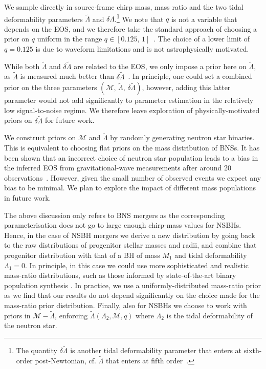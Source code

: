 \documentclass[twocolumn]{aastex631}
\begin{document}
We sample directly in source-frame chirp mass, mass ratio and the two
tidal deformability parameters $\tilde{\Lambda}$ and
$\delta\Lambda$.\footnote{The quantity $\delta\tilde{\Lambda}$ is another
tidal deformability parameter that enters at sixth-order post-Newtonian,
cf. $\tilde{\Lambda}$ that enters at fifth order~\citep[see][for
  definitions of the these quantities]{favata14,wade14}.}  We note that
$q$ is not a variable that depends on the EOS, and we therefore take the
standard approach of choosing a prior on $q$ uniform in the range
$q\in[0.125,\,1]$~\citep[e.g.,][]{romeroshaw20}. The choice of a lower
limit of $q=0.125$ is due to waveform limitations and is not
astrophysically motivated.

While both $\tilde{\Lambda}$ and $\delta\tilde{\Lambda}$ are
related to the EOS, we only impose a prior here on $\tilde{\Lambda}$, as
$\tilde{\Lambda}$ is measured much better than
$\delta\tilde{\Lambda}$~\citep[e.g.,][]{wade14}. In principle, one could
set a combined prior on the three parameters $(\mathcal{M},\,
\tilde{\Lambda}, \,\delta\tilde{\Lambda})$, however, adding this latter
parameter would not add significantly to parameter estimation in the
relatively low signal-to-noise regime. We therefore leave exploration of
physically-motivated priors on $\delta\tilde{\Lambda}$ for future work.

We construct priors on $\mathcal{M}$ and $\tilde{\Lambda}$ by randomly
generating neutron star binaries. This is equivalent to choosing flat
priors on the mass distribution of BNSs. It has been shown that an incorrect choice of neutron star population leads to a bias in the inferred EOS from
gravitational-wave measurements after around 20 observations~\citep[e.g.,][]{2015Agathos,2020Wysocki,2020Landry}. However, given the small number of observed
events we expect any bias to be minimal. We plan to explore
the impact of different mass populations in future work.

The above discussion only refers to BNS mergers as the corresponding
parameterisation does not go to large enough chirp-mass values for
NSBHs. Hence, in the case of NSBH mergers we derive a new distribution by
going back to the raw distributions of progenitor stellar masses and
radii, and combine that progenitor distribution with that of a BH of mass
$M_1$ and tidal deformability $\Lambda_1=0$. In principle, in this case
we could use more sophisticated and realistic mass-ratio distributions,
such as those informed by state-of-the-art binary population synthesis
\citep[e.g.,][]{2021Broekgaarden+}. In practice, we use a
uniformly-distributed mass-ratio prior as we find that our results do not
depend significantly on the choice made for the mass-ratio prior
distribution. Finally, also for NSBHs we choose to work with priors in
$\mathcal{M}\!- \!\tilde{\Lambda}$, enforcing
$\tilde{\Lambda}(\Lambda_2,\mathcal{M},q)$ where $\Lambda_2$ is the tidal
deformability of the neutron star.
\end{document}

